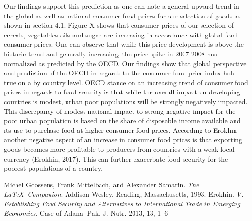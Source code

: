 \documentclass[12pt,a4paper,english]{article}
\begin{document}
Our findings support this prediction as one can note a general upward trend in the global as well as national consumer food prices for our selection of goods as shown in section 4.1. Figure X shows that consumer prices of our selection of cereals, vegetables oils and sugar are increasing in accordance with global food consumer prices. One can observe that while this price development is above the historic trend and generally increasing, the price spike in 2007-2008 has normalized as predicted by the OECD. Our findings show that global perspective and prediction of the OECD in regards to the consumer food price index hold true on a by country level. 
OECD stance on an increasing trend of consumer food prices in regards to food security is that while the overall impact on developing countries is modest, urban poor populations will be strongly negatively impacted. This discrepancy of modest national impact to strong negative impact for the poor urban population is based on the share of disposable income available and its use to purchase food at higher consumer food prices. According to Erokhin another negative aspect of an increase in consumer food prices is that exporting goods becomes more profitable to producers from countries with a weak local currency (Erokhin, 2017). This can further exacerbate food security for the poorest populations of a country. 




\begin{thebibliography}{9}
 Michel Goossens, Frank Mittelbach, and Alexander Samarin. \textit{The \LaTeX\ Companion}. Addison-Wesley, Reading, Massachusetts, 1993.
 Erokhin. \textit{V. Establishing Food Security and Alternatives to International Trade in Emerging Economies}.  Case of Adana. Pak. J. Nutr. 2013, 13, 1–6
\end{thebibliography}
\end{document}
